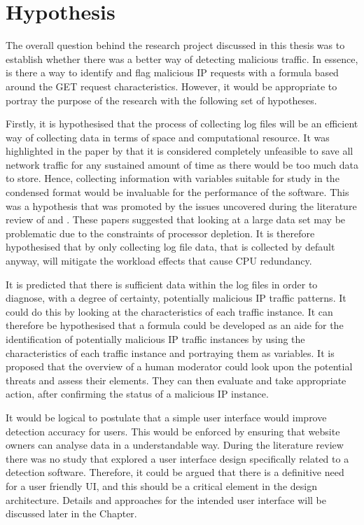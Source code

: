 \section{Hypothesis}

The overall question behind the research project discussed in this thesis was to establish whether there was a better way of detecting malicious traffic. In essence, is there a way to identify and flag malicious IP requests with a formula based around the GET request characteristics. However, it would be appropriate to portray the purpose of the research with the following set of hypotheses.

Firstly, it is hypothesised that the process of collecting log files will be an efficient way of collecting data in terms of space and computational resource. It was highlighted in the \citeyear{staniford2002practical} paper by \citeauthor{staniford2002practical} that it is considered completely unfeasible to save all network traffic for any sustained amount of time as there would be too much data to store. Hence, collecting information with variables suitable for study in the condensed format would be invaluable for the performance of the software. This was a hypothesis that was promoted by the issues uncovered during the literature review of \cite{Adi2015} and \cite{Adi2016}. These papers suggested that looking at a large data set may be problematic due to the constraints of processor depletion. It is therefore hypothesised that by only collecting log file data, that is collected by default anyway, will mitigate the workload effects that cause CPU redundancy.

It is predicted that there is sufficient data within the log files in order to diagnose, with a degree of certainty, potentially malicious IP traffic patterns. It could do this by looking at the characteristics of each traffic instance. It can therefore be hypothesised that a formula could be developed as an aide for the identification of potentially malicious IP traffic instances by using the characteristics of each traffic instance and portraying them as variables. It is proposed that the overview of a human moderator could look upon the potential threats and assess their elements. They can then evaluate and take appropriate action, after confirming the status of a malicious IP instance.

It would be logical to postulate that a simple user interface would improve detection accuracy for users. This would be enforced by ensuring that website owners can analyse data in a understandable way. During the literature review there was no study that explored a user interface design specifically related to a detection software. Therefore, it could be argued that there is a definitive need for a user friendly UI, and this should be a critical element in the design architecture. Details and approaches for the intended user interface will be discussed later in the Chapter.

